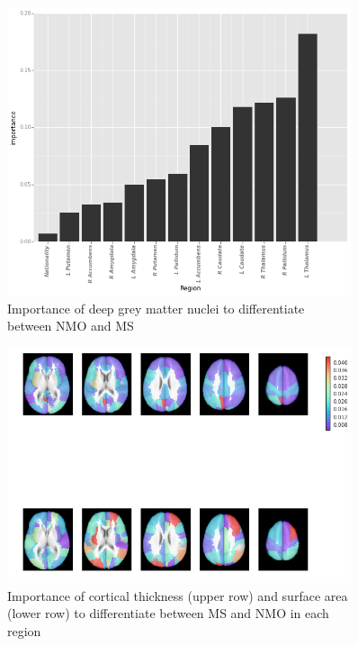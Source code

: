 \documentclass[final]{beamer}
\newlength{\sepwid}
\newlength{\onecolwid}
\newlength{\twocolwid}
\begin{document}
\begin{frame}[t]
\begin{columns}[t]
\begin{column}{\twocolwid}
\begin{columns}[t,totalwidth=\twocolwid]
\begin{column}{\onecolwid}
\end{column} %

\end{columns} %

\end{column} %

\begin{column}{\sepwid}\end{column} %

\begin{column}{\onecolwid} %




\begin{figure}
\includegraphics[width=0.7\linewidth]{v3_dgm_importance.png}
\caption{Importance of deep grey matter nuclei to differentiate between NMO and MS}
\end{figure}


\begin{figure}
\includegraphics[width=0.7\linewidth]{v3_image_importance.png}
\caption{Importance of cortical thickness (upper row) and surface area (lower row) to differentiate between MS and NMO in each region}
\end{figure}


\end{column}
\end{columns}
\end{frame}
\end{document}
